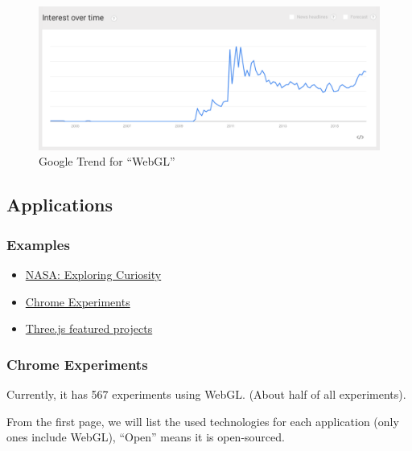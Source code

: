 \documentclass[]{article}
\begin{document}
\begin{figure}[h]
  \includegraphics{images/trend.png}
  \caption{Google Trend for ``WebGL''}
\end{figure}

\subsection{Applications}\label{applications}

\subsubsection{Examples}\label{examples}

\begin{itemize}
\itemsep1pt\parskip0pt
\item
  \href{http://eyes.nasa.gov/curiosity/}{NASA: Exploring Curiosity}
\item
  \href{https://www.chromeexperiments.com}{Chrome Experiments}
\item
  \href{http://threejs.org}{Three.js featured projects}
\end{itemize}

\subsubsection{Chrome Experiments}\label{chrome-experiments}

Currently, it has 567 experiments using WebGL. (About half of all
experiments).

From the first page, we will list the used technologies for each
application (only ones include WebGL), ``Open'' means it is
open-sourced.
\end{document}
